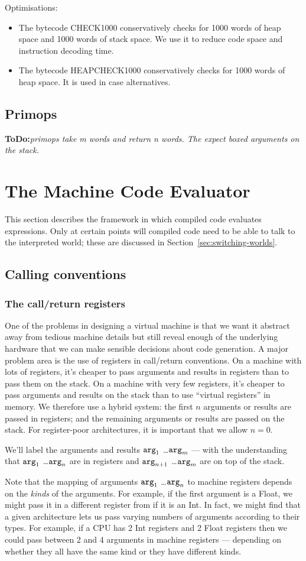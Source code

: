\documentclass[11pt]{article}
\newcommand{\ToDo}[1]{{{\bf ToDo:}\sl #1}}
\newcommand{\Arg}[1]{\mbox{${\tt arg}_{#1}$}}
\newcommand{\secref}[1]{Section~\ref{sec:#1}}
\newcommand{\Section}[2]{\section{#1}\label{sec:#2}}
\newcommand{\Subsection}[2]{\subsection{#1}\label{sec:#2}}
\newcommand{\Subsubsection}[2]{\subsubsection{#1}\label{sec:#2}}
\begin{document}
Optimisations:
\begin{itemize}
\item The bytecode CHECK1000 conservatively checks for 1000 words of heap space and 1000 words of stack space.
      We use it to reduce code space and instruction decoding time.
\item The bytecode HEAPCHECK1000 conservatively checks for 1000 words of heap space.
      It is used in case alternatives.
\end{itemize}


\Subsection{Primops}{hugs-primops}

\ToDo{primops take m words and return n words. The expect boxed arguments on the stack.}


\Section{The Machine Code Evaluator}{asm-evaluator}

This section describes the framework in which compiled code evaluates
expressions.  Only at certain points will compiled code need to be
able to talk to the interpreted world; these are discussed in
\secref{switching-worlds}.

\Subsection{Calling conventions}{ghc-calling-conventions}

\Subsubsection{The call/return registers}{ghc-regs}

One of the problems in designing a virtual machine is that we want it
abstract away from tedious machine details but still reveal enough of
the underlying hardware that we can make sensible decisions about code
generation.  A major problem area is the use of registers in
call/return conventions.  On a machine with lots of registers, it's
cheaper to pass arguments and results in registers than to pass them
on the stack.  On a machine with very few registers, it's cheaper to
pass arguments and results on the stack than to use ``virtual
registers'' in memory.  We therefore use a hybrid system: the first
$n$ arguments or results are passed in registers; and the remaining
arguments or results are passed on the stack.  For register-poor
architectures, it is important that we allow $n=0$.

We'll label the arguments and results \Arg{1} \ldots \Arg{m} --- with
the understanding that \Arg{1} \ldots \Arg{n} are in registers and
\Arg{n+1} \ldots \Arg{m} are on top of the stack.

Note that the mapping of arguments \Arg{1} \ldots \Arg{n} to machine
registers depends on the \emph{kinds} of the arguments.  For example,
if the first argument is a Float, we might pass it in a different
register from if it is an Int.  In fact, we might find that a given
architecture lets us pass varying numbers of arguments according to
their types.  For example, if a CPU has 2 Int registers and 2 Float
registers then we could pass between 2 and 4 arguments in machine
registers --- depending on whether they all have the same kind or they
have different kinds.
\end{document}
